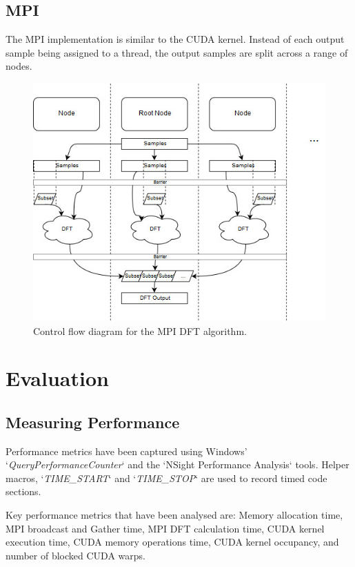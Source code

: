 \documentclass[11pt,a4paper]{article}
\begin{document}
\subsection{MPI}
The MPI implementation is similar to the CUDA kernel. Instead of each output sample being assigned to a thread, the output samples are split across a range of nodes. 

\begin{figure}[H]
\begin{center}
\includegraphics[scale=0.7]{mpi_impl1}
\end{center}
\caption{Control flow diagram for the MPI DFT algorithm.}
\label{fig:train10x}
\end{figure}

\section{Evaluation}
\subsection{Measuring Performance}
Performance metrics have been captured using Windows' `\textit{QueryPerformanceCounter}` and the `NSight Performance Analysis` tools. Helper macros, `\textit{TIME\_START}` and `\textit{TIME\_STOP}` are used to record timed code sections.

Key performance metrics that have been analysed are: Memory allocation time, MPI broadcast and Gather time, MPI DFT calculation time, CUDA kernel execution time, CUDA memory operations time, CUDA kernel occupancy, and number of blocked CUDA warps.
\end{document}
